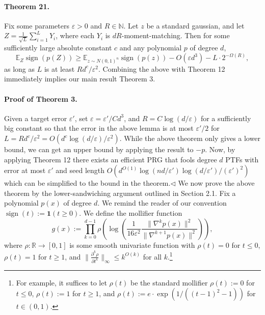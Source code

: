 \documentclass[10pt,a4paper]{article}
\begin{document}
\paragraph{Theorem 21.} Fix some parameters $\varepsilon>0$ and $R\in\mathbb N$. Let $z$ be a standard gaussian, and let $Z=\frac1{\sqrt L}\sum_{i=1}^LY_i$, where each $Y_i$ is $dR$-moment-matching. Then for some sufficiently large absolute constant $c$ and any polynomial $p$ of degree $d$,
\[\mathbb E_Z\operatorname{sign}(p(Z))\geq\mathbb E_{z\sim N(0,1)^n}\operatorname{sign}(p(z))-O(\varepsilon d^3)-L\cdot2^{-\Omega(R)},\]
as long as $L$ is at least $Rd^c/\varepsilon^2$.
Combining the above with Theorem 12 immediately implies our main result Theorem 3.
\paragraph{Proof of Theorem 3.} Given a target error $\varepsilon'$, set $\varepsilon=\varepsilon'/Cd^3$, and $R=C\log(d/\varepsilon)$ for a sufficiently big constant so that the error in the above lemma is at most $\varepsilon'/2$ for $L=Rd^c/\varepsilon^2=O(d^c\log(d/\varepsilon)/\varepsilon^2)$. While the above theorem only gives a lower bound, we can get an upper bound by applying the result to $-p$. Now, by applying Theorem 12 there exists an efficient PRG that fools degree $d$ PTFs with error at most $\varepsilon'$ and seed length $O(d^{O(1)}\log(nd/\varepsilon')\log(d/\varepsilon')/(\varepsilon')^2)$ which can be simplified to the bound in the theorem.\hfill$\triangleleft$
We now prove the above theorem by the lower-sandwiching argument outlined in Section 2.1. Fix a polynomial $p(x)$ of degree $d$. We remind the reader of our convention $\operatorname{sign}(t):=\boldsymbol1(t\geq0)$.
We define the mollifier function
\[g(x):=\prod_{k=0}^{d-1}\rho\left(\log\left(\frac1{16\varepsilon^2}\frac{\|\nabla^kp(x)\|^2}{\|\nabla^{k+1}p(x)\|^2}\right)\right),\]
where $\rho:\mathbb R\to[0,1]$ is some smooth univariate function with $\rho(t)=0$ for $t\leq0$, $\rho(t)=1$ for $t\geq1$, and $\|\frac{\partial^k\rho}{\partial t^k}\|_\infty\leq k^{O(k)}$ for all $k$.\footnote{For example, it suffices to let $\rho(t)$ be the standard mollifier $\rho(t):=0$ for $t\leq0$, $\rho(t):=1$ for $t\geq1$, and $\rho(t):=e\cdot\exp(1/((t-1)^2-1))$ for $t\in(0,1)$.}
\end{document}
